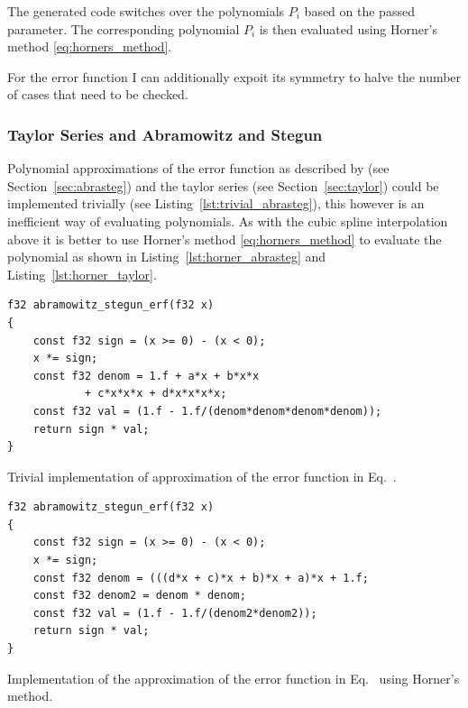 \documentclass[a4paper, 11pt]{memoir}
\begin{document}
    The generated code switches over the polynomials $P_i$ based on the passed parameter. The corresponding polynomial
    $P_i$ is then evaluated using Horner's method \eqref{eq:horners_method}.

    For the error function I can additionally expoit its symmetry to halve the number of cases that need to be checked.

    \subsubsection{Taylor Series and Abramowitz and Stegun}
    \label{sec:impl_abrasteg_taylor}
    Polynomial approximations of the error function as described by \citeauthor{AbraSteg72} (see
    Section~\ref{sec:abrasteg}) and the taylor series (see Section~\ref{sec:taylor}) could be implemented trivially (see
    Listing~\ref{lst:trivial_abrasteg}), this however is an inefficient way of evaluating polynomials. As with the cubic
    spline interpolation above it is better to use Horner's method \eqref{eq:horners_method} to evaluate the polynomial
    as shown in Listing~\ref{lst:horner_abrasteg} and Listing~\ref{lst:horner_taylor}.

    \begin{listing}[t]
        \begin{verbatim}
f32 abramowitz_stegun_erf(f32 x)
{
    const f32 sign = (x >= 0) - (x < 0);
    x *= sign;
    const f32 denom = 1.f + a*x + b*x*x
            + c*x*x*x + d*x*x*x*x;
    const f32 val = (1.f - 1.f/(denom*denom*denom*denom));
    return sign * val;
}
        \end{verbatim}
        \caption{Trivial implementation of approximation of the error function in Eq.~.}
        \label{lst:trivial_abrasteg}
    \end{listing}

    \begin{listing}[t]
        \begin{verbatim}
f32 abramowitz_stegun_erf(f32 x)
{
    const f32 sign = (x >= 0) - (x < 0);
    x *= sign;
    const f32 denom = (((d*x + c)*x + b)*x + a)*x + 1.f;
    const f32 denom2 = denom * denom;
    const f32 val = (1.f - 1.f/(denom2*denom2));
    return sign * val;
}
        \end{verbatim}
        \caption{Implementation of the approximation of the error function in Eq.~ using Horner's method.}
        \label{lst:horner_abrasteg}
    \end{listing}
\end{document}
